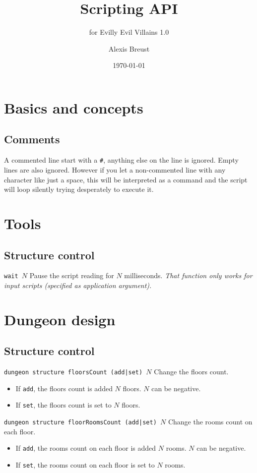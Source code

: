 \documentclass[10pt,a4paper]{scrartcl}
\title{Scripting API}
\subtitle{for Evilly Evil Villains 1.0}
\author{Alexis Breust}
\date{\today}
\newenvironment{apiCode}[1]
{ \begin{lrbox}{\mybox} \begin{minipage}{0.9\textwidth} {\color{Mahogany} \small\texttt{#1}} \vspace{8pt} \newline }
{ \end{minipage} \end{lrbox}\fbox{\usebox{\mybox}} \newline\vspace{4pt}\newline }
\begin{document}
\maketitle

\section{Basics and concepts}
\subsection{Comments}
A commented line start with a \texttt{\#}, anything else on the line is ignored. Empty lines are also ignored. However if you let a non-commented line with any character like just a space, this will be interpreted as a command and the script will loop silently trying desperately to execute it.

\section{Tools}
\subsection{Structure control}
\begin{apiCode}{wait $N$}
Pause the script reading for $N$ milliseconds.\newline
\textit{That function only works for input scripts (specified as application argument).}
\end{apiCode}

\section{Dungeon design}
\subsection{Structure control}
\begin{apiCode}{dungeon structure floorsCount (add|set) $N$}
Change the floors count.
\begin{itemize}
\itemsep 0em
\item If \verb#add#, the floors count is added $N$ floors. $N$ can be negative.
\item If \verb#set#, the floors count is set to $N$ floors.
\end{itemize}
\end{apiCode}
\begin{apiCode}{dungeon structure floorRoomsCount (add|set) $N$}
Change the rooms count on each floor.
\begin{itemize}
\itemsep 0em
\item If \verb#add#, the rooms count on each floor is added $N$ rooms. $N$ can be negative.
\item If \verb#set#, the rooms count on each floor is set to $N$ rooms.
\end{itemize}
\end{apiCode}
\end{document}
